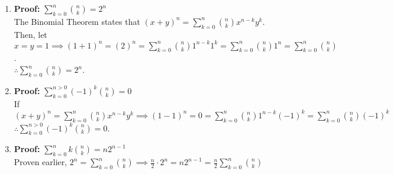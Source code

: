 \documentclass{article}
\newcommand{\proof}[1]{\textbf{Proof: #1}}
\begin{document}
\begin{enumerate}
  \newpage
  \item \proof{}$\sum_{k=0}^{n}\binom{n}{k} = 2^n$\\
  The Binomial Theorem states that $(x+y)^n = \sum_{k=0}^{n}\binom{n}{k}x^{n-k}y^k$.\\
  Then, let $x=y=1 \implies (1+1)^n = (2)^n = \sum_{k=0}^{n}\binom{n}{k}1^{n-k}1^k = \sum_{k=0}^{n}\binom{n}{k}1^n = \sum_{k=0}^{n}\binom{n}{k}$.\\
  $\therefore \sum_{k=0}^{n}\binom{n}{k} = 2^n$.
  
  \item \proof{} $\sum_{k=0}^{n>0}(-1)^k\binom{n}{k} = 0$\\
  If $(x+y)^n = \sum_{k=0}^{n}\binom{n}{k}x^{n-k}y^k \implies (1 - 1)^n = 0 = \sum_{k=0}^{n}\binom{n}{k}1^{n-k}(-1)^k = \sum_{k=0}^{n}\binom{n}{k}(-1)^k$\\
  $\therefore \sum_{k=0}^{n>0}(-1)^k\binom{n}{k} = 0$.
  \item \proof{}$\sum_{k=0}^{n}k\binom{n}{k}=n2^{n-1}$\\
  Proven earlier, $2^n = \sum_{k=0}^{n}\binom{n}{k} \implies \frac{n}{2}\cdot2^{n} = n2^{n-1} = \frac{n}{2}\sum_{k=0}^{n}\binom{n}{k}$
\end{enumerate}
\end{document}

